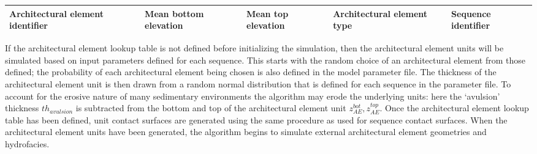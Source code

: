 \documentclass[letterpaper,10pt,english]{sphinxmanual}
\begin{document}
\noindent\begin{tabulary}{\linewidth}{|L|L|L|L|L|}
\hline

Architectural element identifier
&
Mean bottom elevation
&
Mean top elevation
&
Architectural element type
&
Sequence identifier
\\
\hline\end{tabulary}


If the architectural element lookup table is not defined before initializing the simulation, then the architectural element units will be simulated based on input parameters defined for each sequence. This starts with the random choice of an architectural element from those defined; the probability of each architectural element being chosen is also defined in the model parameter file. The thickness of the architectural element unit is then drawn from a random normal distribution that is defined for each sequence in the parameter file. To account for the erosive nature of many sedimentary environments the algorithm may erode the underlying units: here the `avulsion' thickness \(th_{avulsion}\) is subtracted from the bottom and top of the architectural element unit \(z^{bot}_{AE}, z^{top}_{AE}\). Once the architectural element lookup table has been defined, unit contact surfaces are generated using the same procedure as used for sequence contact surfaces. When the architectural element units have been generated, the algorithm begins to simulate external architectural element geometries and hydrofacies.
\end{document}
